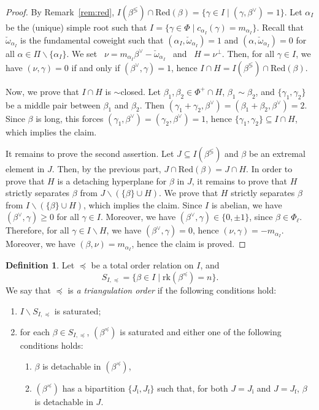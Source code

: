 \documentclass[10pt]{amsart}
\theoremstyle{definition}
\newtheorem{defi}[thm]{Definition}
\theoremstyle{remark}
\newcommand\smeno{\smallsetminus}
\newcommand\rk{\mathrm{rk}}
\newcommand\al{\alpha}
\newcommand\be{\beta}
\newcommand\ga{\gamma}
\newcommand\comp{\lessgtr}
\newcommand\red{\mathrm{Red}}
\newcommand\preq{\preccurlyeq}
\begin{document}
\begin{proof}
By Remark~\ref{rem:red}, $I(\be^{\comp})\cap \red(\be)=\{\ga\in I \mid (\ga, \be^\vee)=1\}$.
Let $\al_I$ be the (unique) simple root such that $I=\{\ga\in \Phi\mid c_{\al_I}(\ga)=m_{\al_I}\}$. 
Recall that $\check\omega_{\al_I}$ is the fundamental coweight such that $(\al_I, \check\omega_{\al_I})=1$ and $(\al, \check\omega_{\al_I})=0$ for all $\al\in \Pi\smeno \{\al_I\}$.
We set \ $\nu=m_{\al_I}\be^\vee-\check\omega_{\al_I}$ \ and \ $H=\nu^\perp$.
Then, for all $\ga\in I$,  we have $(\nu, \ga)=0$ if and only if $(\be^\vee, \ga)=1$, hence $I\cap H= I(\be^{\comp})\cap \red(\be)$.

\par 
Now, we prove that $I\cap H$ is $\sim$closed. 
Let $\be_1, \be_2\in \Phi^+\cap H$, $\be_1\sim\be_2$, and $\{\ga_1,\ga_2\}$ be a middle pair between $\be_1$ and $\be_2$.
Then $(\ga_1+\ga_2, \be^\vee)=(\be_1+\be_2, \be^\vee)=2$. 
Since $\be$ is long, this forces $(\ga_1, \be^\vee)=(\ga_2, \be^\vee)=1$, hence $\{\ga_1,\ga_2\}\subseteq I \cap H$, which implies the claim.

\par
It remains to prove the second assertion.
Let $J\subseteq I(\be^{\comp})$ and $\be$ be an extremal element in $J$.
Then, by  the previous part, $J\cap \red(\be)= J\cap H$.
In order to prove that $H$ is a detaching hyperplane for $\be$ in $J$, it remains to prove that $H$ strictly  separates $\be$ from $J\smeno (\{\be\}\cup H)$.
We prove that $H$ strictly  separates $\be$ from $I\smeno (\{\be\}\cup H)$, which implies the claim.
Since $I$ is abelian, we have $(\be^\vee, \ga)\geq 0$ for all $\ga\in I$.
Moreover, we have $(\be^\vee, \ga)\in \{0, \pm 1\}$, since $\be\in \Phi_\ell$.
Therefore, for all $\ga\in I\smeno H$,  we have $(\be^\vee, \ga)=0$, hence  $(\nu, \ga)=-m_{\al_I}$.
Moreover,  we have $(\be, \nu)=m_{\al_I}$, hence the claim is proved.
\end{proof}

\begin{defi}\label{def:triang-order}
Let 
$\preccurlyeq$ be a total order relation on $I$,  and 
$$
S_{I,\preq}=\{\be\in I\mid \rk(\be^\preq)=n\}.
$$ 
We say that $\preq$ is {\em a triangulation order} if the following conditions hold:
\begin{enumerate}
\item\label{itm:interno}
$I\smeno S_{I,\preq}$ is saturated; 
\item\label{itm:esterno}
for each $\be\in S_{I,\preq}$,  $(\be^\preq)$ is saturated and either one of the following conditions holds:
\begin{enumerate}[label=\textup{(\alph*)}]
\item $\be$ is detachable in  $(\be^\preq)$,  
\item $(\be^\preq)$ has a bipartition $\{J_{\mathrm i}, J_{\mathrm f}\}$ such that,  for both $J=J_{\mathrm i}$ and $J=J_{\mathrm f}$, $\be$ is detachable in $J$.%
\end{enumerate}
\end{enumerate}
\end{defi}
\end{document}
